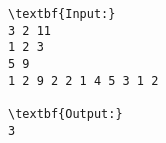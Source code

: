 \begin{verbatim}
\textbf{Input:}
3 2 11
1 2 3
5 9
1 2 9 2 2 1 4 5 3 1 2

\textbf{Output:}
3\end{verbatim}